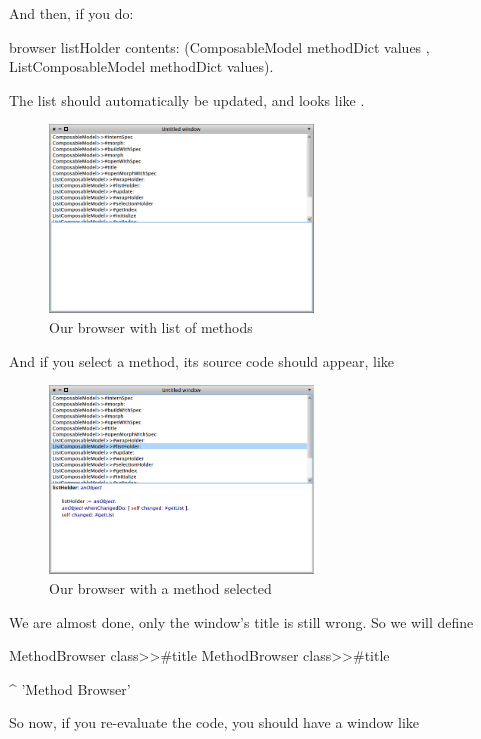 \documentclass[a4paper,10pt,twoside]{book}
\begin{document}
And then, if you do:
\begin{code}{}
browser  listHolder contents: (ComposableModel methodDict values , ListComposableModel methodDict values).
\end{code}
The list should automatically be updated, and looks like .
\begin{figure}[ht]
\begin{center}
	\includegraphics[width=7cm]{MethodBrowser2}
	\caption{Our browser with list of methods}
\end{center}
\end{figure}

\newpage
And if you select a method, its source code should appear, like 

\begin{figure}[ht]
\begin{center}
	\includegraphics[width=7cm]{MethodBrowser3}
	\caption{Our browser with a method selected}
\end{center}
\end{figure}

We are almost done, only the window's title is still wrong.
So we will define
\begin{method}{MethodBrowser class>>\#title}
MethodBrowser class>>#title

	^ 'Method Browser'
\end{method}

So now, if you re-evaluate the code, you should have a window like 
\end{document}
